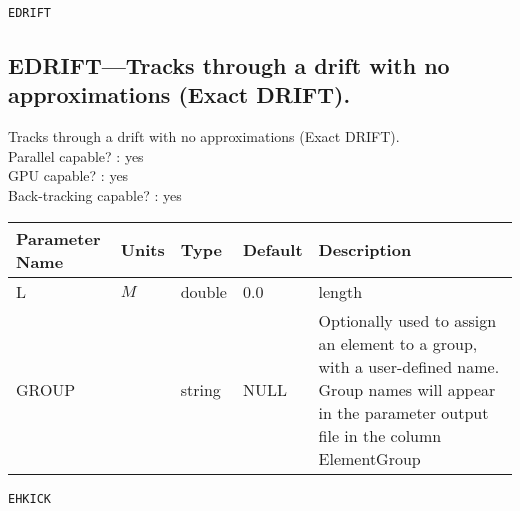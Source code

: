 \newpage
\begin{center}{\Large\verb|EDRIFT|}\end{center}
\subsection{EDRIFT---Tracks through a drift with no approximations (Exact DRIFT).}
Tracks through a drift with no approximations (Exact DRIFT).
\\
Parallel capable? : yes\\
GPU capable? : yes\\
Back-tracking capable? : yes\\
\begin{tabular}{|l|l|l|l|p{\descwidth}|} \hline
Parameter Name & Units & Type & Default & Description \\ \hline 
L & $M$ & double &  0.0 & length  \\ \hline 
GROUP &  & string & NULL & Optionally used to assign an element to a group, with a user-defined name.  Group names will appear in the parameter output file in the column ElementGroup  \\ \hline 
\end{tabular}

\newpage
\begin{center}{\Large\verb|EHKICK|}\end{center}
